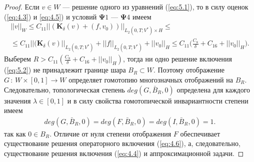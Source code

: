 \documentclass[14pt, a4paper]{extarticle}
\numberwithin{equation}{section}
\begin{document}
\begin{proof}
        Если $v \in W$ --- решение одного из уравнений (\ref{eq:5.1}), то в силу оценок (\ref{eq:4.3}) и \ref{eq:4.5})
        и условий $\boldsymbol{\Psi}1$ --- $\boldsymbol{\Psi}4$ имеем
        \begin{equation*}
            \begin{gathered}
                ||v||_W \leq C_{11} ||(\boldsymbol{K}_\delta(v) + (f, v_0))||_{L_2(0,T;V^*) \times H} \leq\\
                \leq C_{11} ||(\boldsymbol{K}_\delta(v)||_{L_2(0,T;V^*)} + ||f||_{L_2(0,T;V^*)} + ||v_0||_H \leq
                C_{11} \bigg( \frac{C_8}{\delta} + C_{16} + ||v_0||_H \bigg).
            \end{gathered}
        \end{equation*}
        Выберем $R >  C_{11} (\frac{C_8}{\delta} + C_{16} + ||v_0||_H)$,
        тогда ни одно решение включения (\ref{eq:5.2}) не принадлежит границе шара $B_R \subset W$.
        Поэтому отображение $G\, : \,W \times [0,1] \rightarrow W$ определяет гомотопию
        многозначных отображений на $B_R$. Следовательно, топологическая степень $deg(G,\bar{B}_R,0)$
        определена для каждого значения $\lambda \in [0,1]$ и в силу свойства
        гомотопической инвариантности степени имеем
        \begin{equation*}
            \begin{gathered}
                deg(G,\bar{B}_R,0) = deg(F,\bar{B}_R,0) = deg(I,\bar{B}_R,0) = 1.
            \end{gathered}
        \end{equation*}
        так как $0 \in B_R$. Отличие от нуля степени отображения $F$ обеспечивает существование
        решения операторного включения (\ref{eq:4.6}), а, следовательно, существование решения включения 
        (\ref{eq:4.4}) и аппроксимационной задачи.
    \end{proof}
\end{document}
